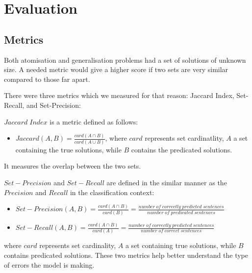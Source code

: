 \section{Evaluation}

\subsection{Metrics}

Both atomisation and generalisation problems had a set of solutions of unknown size.
A needed metric would give a higher score if two sets are very similar compared to those far apart.

There were three metrics which we measured for that reason: Jaccard Index, Set-Recall, and Set-Precision:

$Jaccard \; Index$ is a metric defined as follows:
\begin{itemize}
   \item $Jaccard(A, B) = \frac{card(A \cap B)}{card(A \cup B)}$, where $card$ represents set cardinatlity, $A$ a set containing the true solutions, while $B$ contains the predicated solutions.\\
\end{itemize}
It measures the overlap between the two sets.
 
$Set-Precision$ and $Set-Recall$ are defined in the similar manner as the $Precision$ and $Recall$ in the classification context:
\begin{itemize}
    \item $Set-Precision(A, B) = \frac{card(A \cap B)}{card(B)} = \frac{number \; of \; correctly \; predicted \; sentences}{number \; of \; predicated \; sentences}$
    \item $Set-Recall(A, B) = \frac{card(A \cap B)}{card(A)} = \frac{number \; of \; correctly \; predicted \; sentences}{number \; of \; correct \; sentences} $ 
\end{itemize}
where $card$ represents set cardinality, $A$ a set containing true solutions, while $B$ contains predicated solutions. 
These two metrics help better understand the type of errors the model is making.


% 
% 
% 
% 

